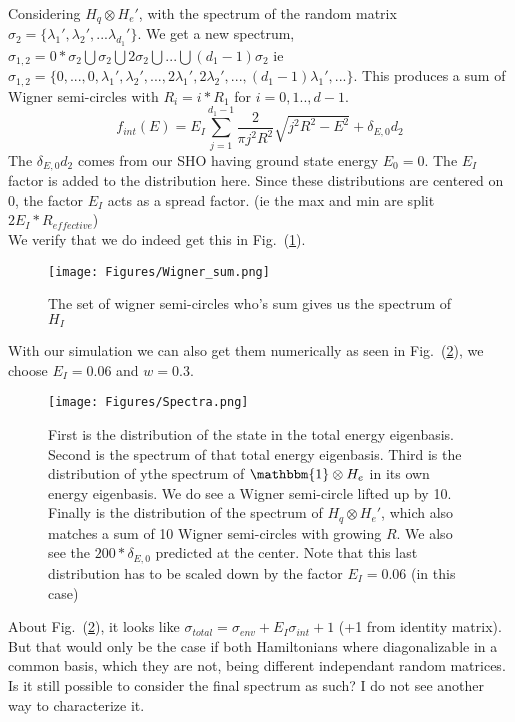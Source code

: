 \documentclass{article}
\begin{document}
Considering $H_q\otimes H_{e}'$, with the spectrum of the random matrix $\sigma_2=\{\lambda_1',\lambda_2',...\lambda_{d_1}'\}$. We get a new spectrum,  $\sigma_{1,2}=0*\sigma_2\bigcup\sigma_2\bigcup2\sigma_2\bigcup ...\bigcup(d_1-1)\sigma_2$ ie $\sigma_{1,2}= \{0,...,0,\lambda_1', \lambda_2', ..., 2\lambda_1', 2\lambda_2',..., (d_1-1)\lambda_1',...\}$. This produces a sum of Wigner semi-circles with $R_i=i*R_1$ for $i=0,1..,d-1$.
\begin{equation}
    f_{int}(E) = E_I\sum_{j=1}^{d_1-1}\frac{2}{\pi j^2R^2}\sqrt{j^2R^2-E^2} + \delta_{E,0}d_2
\end{equation}
The $\delta_{E,0}d_2$ comes from our SHO having ground state energy $E_0=0$. The $E_I$ factor is added to the distribution here. Since these distributions are centered on 0, the factor $E_I$ acts as a spread factor. (ie the max and min are split $2E_I*R_{effective}$)\\

We verify that we do indeed get this in Fig.~(\ref{fig:wigner_sum}). 

\begin{figure}
    \centering
    \texttt{[image: Figures/Wigner\_sum.png]}
    \caption{The set of wigner semi-circles who's sum gives us the spectrum of $H_I$}
    \label{fig:wigner_sum}
\end{figure}

With our simulation we can also get them numerically as seen in Fig.~(\ref{fig:spectra}), we choose $E_I=0.06$ and $w=0.3$.
\begin{figure}
    \centering
    \texttt{[image: Figures/Spectra.png]}
    \caption{First is the distribution of the state in the total energy eigenbasis. Second is the spectrum of that total energy eigenbasis. Third is the distribution of ythe spectrum of $\mathbbm{1}\otimes H_e$ in its own energy eigenbasis. We do see a Wigner semi-circle lifted up by 10. Finally is the distribution of the spectrum of $H_q\otimes H_e'$, which also matches a sum of 10 Wigner semi-circles with growing $R$. We also see the $200*\delta_{E,0}$ predicted at the center. Note that this last distribution has to be scaled down by the factor $E_I=0.06$ (in this case)}
    \label{fig:spectra}
\end{figure}

About Fig.~(\ref{fig:spectra}), it looks like $\sigma_{total}=\sigma_{env}+E_I\sigma_{int} + 1$ (+1 from identity matrix). But that would only be the case if both Hamiltonians where diagonalizable in a common basis, which they are not, being different independant random matrices. Is it still possible to consider the final spectrum as such? I do not see another way to characterize it.\\
\end{document}
